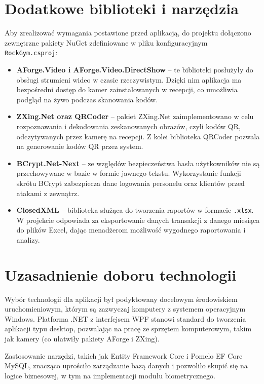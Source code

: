 \section{Dodatkowe biblioteki i narzędzia}
Aby zrealizować wymagania postawione przed aplikacją, do projektu dołączono zewnętrzne pakiety NuGet zdefiniowane w pliku konfiguracyjnym \texttt{RockGym.csproj}:
\begin{itemize}
    \item \textbf{AForge.Video i AForge.Video.DirectShow} -- te biblioteki posłużyły do obsługi strumieni wideo w czasie rzeczywistym. Dzięki nim aplikacja ma bezpośredni dostęp do kamer zainstalowanych w recepcji, co umożliwia podgląd na żywo podczas skanowania kodów.
    \item \textbf{ZXing.Net oraz QRCoder} -- pakiet ZXing.Net zaimplementowano w celu rozpoznawania i dekodowania zeskanowanych obrazów, czyli kodów QR, odczytywanych przez kamerę na recepcji. Z kolei biblioteka QRCoder pozwala na generowanie kodów QR przez system.
    \item \textbf{BCrypt.Net-Next} -- ze względów bezpieczeństwa hasła użytkowników nie są przechowywane w bazie w formie jawnego tekstu. Wykorzystanie funkcji skrótu BCrypt zabezpiecza dane logowania personelu oraz klientów przed atakami z zewnątrz.
    \item \textbf{ClosedXML} -- biblioteka służąca do tworzenia raportów w formacie \texttt{.xlsx}. W projekcie odpowiada za eksportowanie danych transakcji z danego miesiąca do plików Excel, dając menadżerom możliwość wygodnego raportowania i analizy.
\end{itemize}

\section{Uzasadnienie doboru technologii}
Wybór technologii dla aplikacji był podyktowany docelowym środowiskiem uruchomieniowym, którym są zazwyczaj komputery z systemem operacyjnym Windows. Platforma .NET z interfejsem WPF stanowi standard do tworzenia aplikacji typu desktop, pozwalając na pracę ze sprzętem komputerowym, takim jak kamery (co ułatwiły pakiety AForge i ZXing).

Zastosowanie narzędzi, takich jak Entity Framework Core i Pomelo EF Core MySQL, znacząco uprościło zarządzanie bazą danych i pozwoliło skupić się na logice biznesowej, w tym na implementacji modułu biometrycznego.